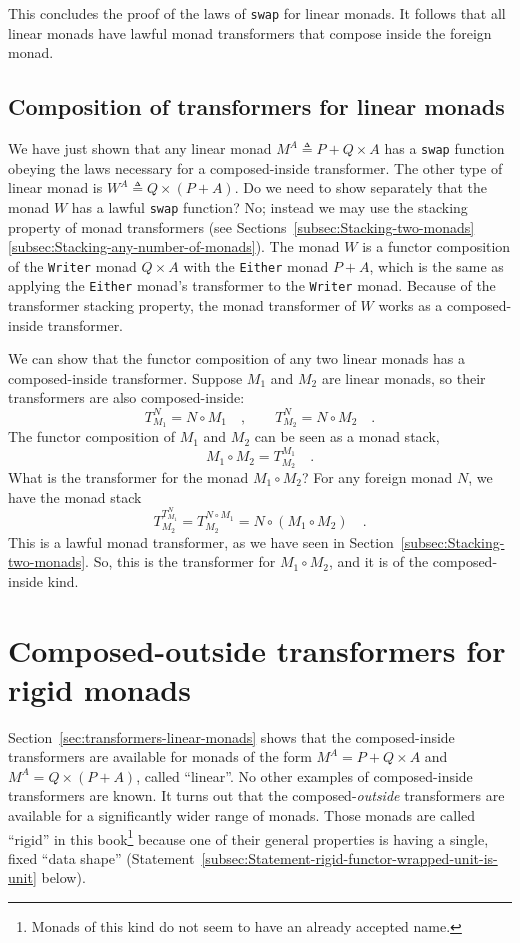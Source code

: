 This concludes the proof of the laws of \lstinline!swap! for linear
monads. It follows that all linear monads have lawful monad transformers
that compose inside the foreign monad.

\subsection{Composition of transformers for linear monads}

We have just shown that any linear monad $M^{A}\triangleq P+Q\times A$
has a \lstinline!swap! function obeying the laws necessary for a
composed-inside transformer. The other type of linear monad is $W^{A}\triangleq Q\times\left(P+A\right)$.
Do we need to show separately that the monad $W$ has a lawful \lstinline!swap!
function? No; instead we may use the stacking property of monad transformers
(see Sections~\ref{subsec:Stacking-two-monads}\textendash \ref{subsec:Stacking-any-number-of-monads}).
The monad $W$ is a functor composition of the \lstinline!Writer!
monad $Q\times A$ with the \lstinline!Either! monad $P+A$, which
is the same as applying the \lstinline!Either! monad\textsf{'}s transformer
to the \lstinline!Writer! monad. Because of the transformer stacking
property, the monad transformer of $W$ works as a composed-inside
transformer.

We can show that the functor composition of any two linear monads
has a composed-inside transformer. Suppose $M_{1}$ and $M_{2}$ are
linear monads, so their transformers are also composed-inside:
\[
T_{M_{1}}^{N}=N\circ M_{1}\quad,\quad\quad T_{M_{2}}^{N}=N\circ M_{2}\quad.
\]
The functor composition of $M_{1}$ and $M_{2}$ can be seen as a
monad stack,
\[
M_{1}\circ M_{2}=T_{M_{2}}^{M_{1}}\quad.
\]
What is the transformer for the monad $M_{1}\circ M_{2}$? For any
foreign monad $N$, we have the monad stack
\[
T_{M_{2}}^{T_{M_{1}}^{N}}=T_{M_{2}}^{N\circ M_{1}}=N\circ\left(M_{1}\circ M_{2}\right)\quad.
\]
This is a lawful monad transformer, as we have seen in Section~\ref{subsec:Stacking-two-monads}.
So, this is the transformer for $M_{1}\circ M_{2}$, and it is of
the composed-inside kind.

\section{Composed-outside transformers for rigid monads\label{sec:transformers-rigid-monads}}

Section~\ref{sec:transformers-linear-monads} shows that the composed-inside
transformers are available for monads of the
form $M^{A}=P+Q\times A$ and $M^{A}=Q\times\left(P+A\right)$, called
\textsf{``}linear\textsf{''}. No other examples of composed-inside transformers are
known. It turns out that the composed-\emph{outside} transformers
are available for a significantly wider range of monads. Those monads
are called \textsf{``}rigid\textsf{''} in this book\footnote{Monads of this kind do not seem to have an already accepted name.}
because one of their general properties is having a single, fixed
\textsf{``}data shape\textsf{''} (Statement~\ref{subsec:Statement-rigid-functor-wrapped-unit-is-unit}
below). 

